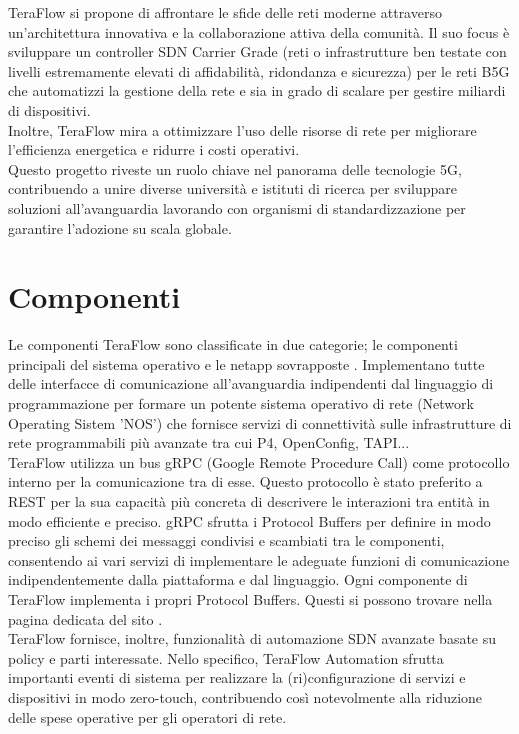 TeraFlow si propone di affrontare le sfide delle reti moderne attraverso un'architettura innovativa e la collaborazione attiva della comunità. 
Il suo focus è sviluppare un controller SDN Carrier Grade (reti o infrastrutture ben testate con livelli estremamente elevati di affidabilità, ridondanza e sicurezza) per le reti B5G che automatizzi la gestione della rete e sia in grado di scalare per gestire miliardi di dispositivi.
\\Inoltre, TeraFlow mira a ottimizzare l'uso delle risorse di rete per migliorare l'efficienza energetica e ridurre i costi operativi.
\\Questo progetto riveste un ruolo chiave nel panorama delle tecnologie 5G, contribuendo a unire diverse università e istituti di ricerca per sviluppare soluzioni all'avanguardia
lavorando con organismi di standardizzazione per garantire l'adozione su scala globale.
\section{Componenti}
Le componenti TeraFlow sono classificate in due categorie; le componenti principali del sistema operativo e le netapp sovrapposte \cite{Component}. 
Implementano tutte delle interfacce di comunicazione all'avanguardia indipendenti dal linguaggio di programmazione 
per formare un potente sistema operativo di rete (Network Operating Sistem 'NOS') che fornisce servizi di connettività sulle infrastrutture di rete programmabili più avanzate tra cui P4, OpenConfig, TAPI...
\\TeraFlow utilizza un bus gRPC (Google Remote Procedure Call) come protocollo interno per la 
comunicazione tra di esse. Questo protocollo è stato preferito a REST per la sua capacità più concreta di descrivere le interazioni tra entità in modo efficiente e preciso.
gRPC sfrutta i Protocol Buffers per definire in modo preciso gli schemi dei messaggi condivisi e scambiati tra le componenti,  consentendo ai vari servizi di implementare le adeguate funzioni di comunicazione indipendentemente dalla piattaforma e dal linguaggio.
Ogni componente di TeraFlow implementa i propri Protocol Buffers. Questi si possono trovare nella pagina dedicata del sito \cite{ProtoBuf}.
\\TeraFlow fornisce, inoltre, funzionalità di automazione SDN avanzate basate su policy e parti interessate. Nello specifico, TeraFlow Automation sfrutta 
importanti eventi di sistema per realizzare la (ri)configurazione di servizi e dispositivi in modo zero-touch, contribuendo così notevolmente alla riduzione delle spese operative per gli operatori di rete\cite{Component}.


